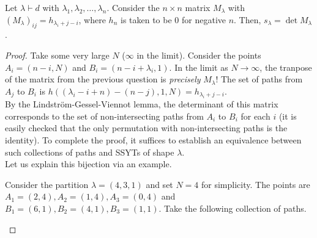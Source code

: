 	\begin{ftheo}
		Let $\lambda \vdash d$ with $\lambda_1,\lambda_2,\ldots,\lambda_n$. Consider the $n \times n$ matrix $M_\lambda$ with $(M_\lambda)_{ij} = h_{\lambda_i + j -i}$, where $h_{n}$ is taken to be $0$ for negative $n$. Then, $s_\lambda = \det M_{\lambda}$.
	\end{ftheo}
	\begin{proof}
		Take some very large $N$ ($\infty$ in the limit). Consider the points $A_i = (n-i,N)$ and $B_i = (n-i+\lambda_i,1)$. In the limit as $N \to \infty$, the tranpose of the matrix from the previous question is \emph{precisely} $M_\lambda$! The set of paths from $A_j$ to $B_i$ is $h( (\lambda_i-i+n)-(n-j) , 1 , N ) = h_{\lambda_i + j - i}$.\\
		By the Lindstr\"{o}m-Gessel-Viennot lemma, the determinant of this matrix corresponds to the set of non-intersecting paths from $A_i$ to $B_i$ for each $i$ (it is easily checked that the only permutation with non-intersecting paths is the identity). To complete the proof, it suffices to establish an equivalence between such collections of paths and SSYTs of shape $\lambda$.\\
		Let us explain this bijection via an example.
		\begin{fex}
			Consider the partition $\lambda = (4,3,1)$ and set $N = 4$ for simplicity. The points are $A_1 = (2,4), A_2 = (1,4), A_3 = (0,4)$ and $B_1 = (6,1), B_2 = (4,1), B_3 = (1,1)$. Take the following collection of paths.

			\begin{center}
			\end{center}


\end{fex}
\end{proof}

